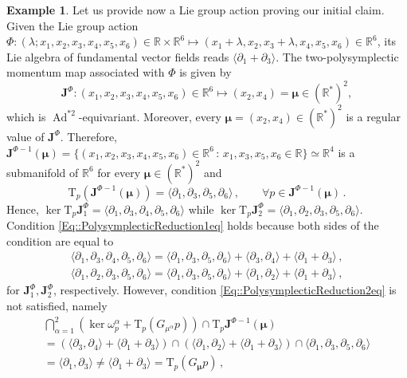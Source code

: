 \documentclass[11pt]{article}
\theoremstyle{plain}
\theoremstyle{definition}
\newtheorem{example}[theorem]{Example}
\newcommand{\T}{\mathrm{T}}
\DeclareMathOperator{\Ad}{Ad}
\numberwithin{equation}{section}
\begin{document}
\begin{example}
Let us provide now a Lie group action proving our initial claim. Given the Lie group action $\Phi:(\lambda;x_1,x_2,x_3,x_4,x_5,x_6)\in\mathbb{R}\times \mathbb{R}^6\mapsto (x_1+\lambda,x_2, x_3+\lambda,x_4,x_5,x_6)\in\mathbb{R}^6$, its Lie algebra of fundamental vector fields reads $\langle\partial_1+\partial_3\rangle$. The two-polysymplectic momentum map associated with $\Phi$ is given by
$$
    \mathbf{J}^\Phi:(x_1,x_2,x_3,x_4,x_5,x_6)\in\mathbb{R}^6\longmapsto (x_2,x_4)=\bm\mu\in (\mathbb{R}^*)^2,
$$
which is $\Ad^{*2}$-equivariant. Moreover, every $\bm\mu=(x_2,x_4)\in (\mathbb{R}^*)^2$ is a regular value of $\mathbf{J}^\Phi$. Therefore,  $\mathbf{J}^{\Phi-1}(\bm\mu)=\{(x_1,x_2,x_3,x_4,x_5,x_6)\in\mathbb{R}^6\,:\, x_1,x_3,x_5,x_6\in \mathbb{R}\}\simeq \mathbb{R}^4$ is a submanifold of $\mathbb{R}^6$ for every $\bm\mu\in(\mathbb{R}^*)^2$ and
$$
    \T_p(\mathbf{J}^{\Phi-1}(\bm\mu))=\langle \partial_1,\partial_3,\partial_5,\partial_6\rangle\,,\qquad \forall p\in \mathbf{J}^{\Phi-1}(\bm\mu)\,.
$$
Hence, $\ker \T_p\mathbf{J}^{\Phi}_1=\langle\partial_1,\partial_3,\partial_4,\partial_5,\partial_6\rangle$ while $\ker \T_p\mathbf{J}^{\Phi}_2=\langle\partial_1,\partial_2,\partial_3,\partial_5,\partial_6\rangle$. Condition \eqref{Eq::PolysymplecticReduction1eq} holds because both sides of the condition are equal to
$$
\begin{gathered}
\langle \partial_1,\partial_3,\partial_4,\partial_5,\partial_6\rangle=  \langle \partial_1,\partial_3,\partial_5,\partial_6\rangle+\langle \partial_3,\partial_4\rangle+\langle \partial_1+\partial_3\rangle\,,\\
\langle \partial_1,\partial_2,\partial_3,\partial_5,\partial_6\rangle=  \langle \partial_1,\partial_3,\partial_5,\partial_6\rangle+\langle \partial_1,\partial_2\rangle+\langle \partial_1+\partial_3\rangle\,,
\end{gathered}
$$
for $\mathbf{J}^\Phi_1,\mathbf{J}^\Phi_2$, respectively.
However, condition \eqref{Eq::PolysymplecticReduction2eq} is not satisfied, namely
\begin{multline*}
    \bigcap^{2}_{\alpha=1}\left(\ker\omega^\alpha_p + \T_p(G_{\mu^\alpha}p) \right)\cap \T_p\mathbf{J}^{\Phi-1}(\bm\mu) \\ = \left(\langle \partial_3,\partial_4\rangle +\langle \partial_1+\partial_3\rangle \right)\cap\left(\langle\partial_1,\partial_2\rangle+\langle\partial_1+\partial_3\rangle\right)
    \cap\langle \partial_1,\partial_3,\partial_5,\partial_6\rangle \\ =\langle\partial_1,\partial_3\rangle \neq \langle \partial_1+\partial_3\rangle = \T_p(G_{\bm\mu}p)\,,

\end{multline*}
\end{example}
\end{document}
